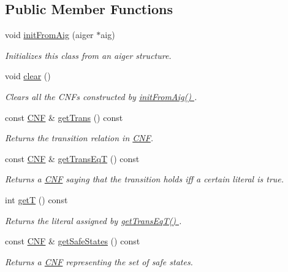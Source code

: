 \subsection*{Public Member Functions}
\begin{DoxyCompactItemize}
\item 
void \hyperlink{classAIG2CNF_aa872708acbdc2bcb1bd23da9a1db2833}{init\-From\-Aig} (aiger $\ast$aig)
\begin{DoxyCompactList}\small\item\em Initializes this class from an aiger structure. \end{DoxyCompactList}\item 
void \hyperlink{classAIG2CNF_a4e3be4d76137eb30a6bed5885f709f29}{clear} ()
\begin{DoxyCompactList}\small\item\em Clears all the C\-N\-Fs constructed by \hyperlink{classAIG2CNF_aa872708acbdc2bcb1bd23da9a1db2833}{init\-From\-Aig() }. \end{DoxyCompactList}\item 
const \hyperlink{classCNF}{C\-N\-F} \& \hyperlink{classAIG2CNF_a02f56e622e210868ffafcdee4ad9fea2}{get\-Trans} () const 
\begin{DoxyCompactList}\small\item\em Returns the transition relation in \hyperlink{classCNF}{C\-N\-F}. \end{DoxyCompactList}\item 
const \hyperlink{classCNF}{C\-N\-F} \& \hyperlink{classAIG2CNF_add8899c00619a3c182e78d21b988d748}{get\-Trans\-Eq\-T} () const 
\begin{DoxyCompactList}\small\item\em Returns a \hyperlink{classCNF}{C\-N\-F} saying that the transition holds iff a certain literal is true. \end{DoxyCompactList}\item 
int \hyperlink{classAIG2CNF_a50f4e351f8d3f3f73b80e70849f00fe1}{get\-T} () const 
\begin{DoxyCompactList}\small\item\em Returns the literal assigned by \hyperlink{classAIG2CNF_add8899c00619a3c182e78d21b988d748}{get\-Trans\-Eq\-T() }. \end{DoxyCompactList}\item 
const \hyperlink{classCNF}{C\-N\-F} \& \hyperlink{classAIG2CNF_ac71ea2d9f9280c8bb3d20d109e892e2d}{get\-Safe\-States} () const 
\begin{DoxyCompactList}\small\item\em Returns a \hyperlink{classCNF}{C\-N\-F} representing the set of safe states. \end{DoxyCompactList}\item 

\end{DoxyCompactItemize}
